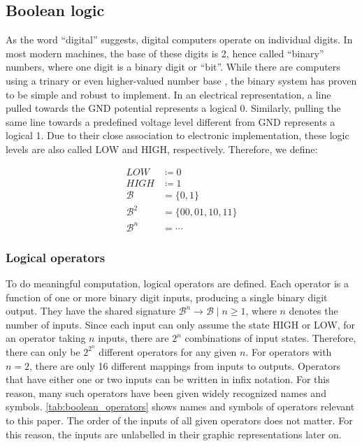 \subsection{Boolean logic}

As the word ``digital'' suggests, digital computers operate on individual digits. In most modern machines, the base of these digits is 2, hence called ``binary'' numbers, where one digit is a binary digit or ``bit''. While there are computers using a trinary or even higher-valued number base \cite{wikipedia_setun}, the binary system has proven to be simple and robust to implement. In an electrical representation, a line pulled towards the GND potential represents a logical 0. Similarly, pulling the same line towards a predefined voltage level different from GND represents a logical 1. Due to their close association to electronic implementation, these logic levels are also called LOW and HIGH, respectively. Therefore, we define:

\begin{align}
    LOW  &\coloneqq 0       \\
    HIGH &\coloneqq 1       \\
    \mathcal{B} &= \{0, 1\} \\
    \mathcal{B}^2 &= \{00, 01, 10, 11\}  \\
    \mathcal{B}^n &= \cdots \nonumber
\end{align}

\subsubsection{Logical operators} \label{sec:logical_operators}

To do meaningful computation, logical operators are defined. Each operator is a function of one or more binary digit inputs, producing a single binary digit output. They have the shared signature $\mathcal{B}^n \to \mathcal{B} \mid n \geq 1$, where $n$ denotes the number of inputs. Since each input can only assume the state HIGH or LOW, for an operator taking $n$ inputs, there are $2^n$ combinations of input states. Therefore, there can only be $2^{2^n}$ different operators for any given $n$. For operators with $n = 2$, there are only 16 different mappings from inputs to outputs. Operators that have either one or two inputs can be written in infix notation. For this reason, many such operators have been given widely recognized names and symbols. \autoref{tab:boolean_operators} shows names and symbols of operators relevant to this paper. The order of the inputs of all given operators does not matter. For this reason, the inputs are unlabelled in their graphic representations later on.

